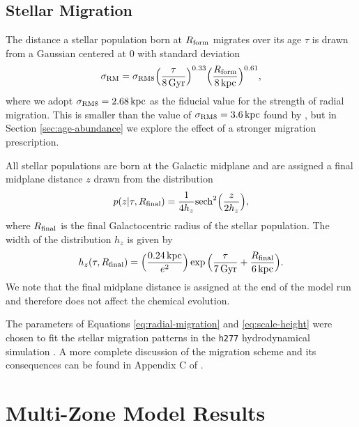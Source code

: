\documentclass[twocolumn,twocolappendix,linenumbers]{aastex631}
\begin{document}
\subsection{Stellar Migration}
\label{sec:migration}

The distance a stellar population born at $R_{\rm form}$ migrates over its age $\tau$ is drawn from a Gaussian centered at 0 with standard deviation
\begin{equation}
    \sigma_{\rm RM} = \sigma_{\rm RM8} \Big(\frac{\tau}{8\,{\rm Gyr}}\Big)^{0.33} \Big(\frac{R_{\rm form}}{8\,{\rm kpc}}\Big)^{0.61},
    \label{eq:radial-migration}
\end{equation}
where we adopt $\sigma_{\rm RM8}=2.68\,{\rm kpc}$ as the fiducial value for the strength of radial migration. This is smaller than the value of $\sigma_{\rm RM8}=3.6\,{\rm kpc}$ found by \citet{frankel_measuring_2018}, but in Section \ref{sec:age-abundance} we explore the effect of a stronger migration prescription.

All stellar populations are born at the Galactic midplane and are assigned a final midplane distance $z$ drawn from the distribution
\begin{equation}
    p(z|\tau,R_{\rm final}) = \frac{1}{4 h_z} {\rm sech}^2\Big(\frac{z}{2 h_z}\Big),
    \label{eq:sech-pdf}
\end{equation}
where $R_{\rm final}$ is the final Galactocentric radius of the stellar population. The width of the distribution $h_z$ is given by
\begin{equation}
    h_z(\tau,R_{\rm final}) = \Big(\frac{0.24\,{\rm kpc}}{e^2}\Big) \exp\Big(\frac{\tau}{7\,{\rm Gyr}} + \frac{R_{\rm final}}{6\,{\rm kpc}}\Big).
    \label{eq:scale-height}
\end{equation}
We note that the final midplane distance is assigned at the end of the model run and therefore does not affect the chemical evolution.

The parameters of Equations \ref{eq:radial-migration} and \ref{eq:scale-height} were chosen to fit the stellar migration patterns in the {\tt h277} hydrodynamical simulation \citep{christensen_implementing_2012}. A more complete discussion of the migration scheme and its consequences can be found in Appendix C of \citet{dubay_galactic_2024}.

\section{Multi-Zone Model Results}
\label{sec:multizone-results}
\end{document}
